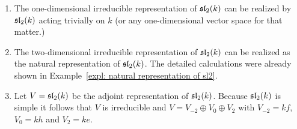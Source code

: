 \begin{expls}
 \begin{enumerate}[leftmargin=*]
  \item
   The one-dimensional irreducible representation of $\mathfrak{sl}_2(k)$ can be realized by $\mathfrak{sl}_2(k)$ acting trivially on $k$ (or any one-dimensional vector space for that matter.)
  \item
   The two-dimensional irreducible representation of $\mathfrak{sl}_2(k)$ can be realized as the natural representation of $\mathfrak{sl}_2(k)$. The detailed calculations were already shown in Example~\ref{expl: natural representation of sl2}.
  \item
   Let $V = \mathfrak{sl}_2(k)$ be the adjoint representation of $\mathfrak{sl}_2(k)$. Because $\mathfrak{sl}_2(k)$ is simple it follows that $V$ is irreducible and $V = V_{-2} \oplus V_0 \oplus V_2$ with $V_{-2} = k f$, $V_0 = k h$ and $V_2 = k e$.
 \end{enumerate}
\end{expls}


